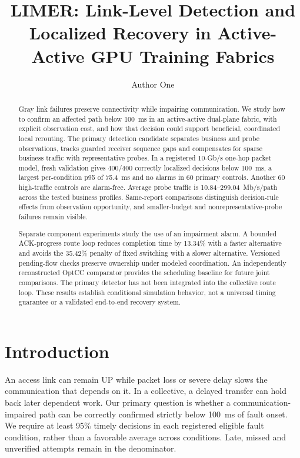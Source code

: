 \documentclass[sigconf]{acmart}
\begin{document}
\title{LIMER: Link-Level Detection and Localized Recovery
in Active-Active GPU Training Fabrics}

\author{Author One}

\begin{abstract}
Gray link failures preserve connectivity while impairing communication.
We study how to confirm an affected path below 100~ms in an active-active
dual-plane fabric, with explicit observation cost, and how that decision
could support beneficial, coordinated local rerouting. The primary
detection candidate separates business and probe observations, tracks
guarded receiver sequence gaps and compensates for sparse business traffic
with representative probes. In a registered 10-Gb/s one-hop packet model,
fresh validation gives 400/400 correctly localized decisions below 100~ms,
a largest per-condition p95 of 75.4~ms and no alarms in 60 primary controls.
Another 60 high-traffic controls are alarm-free. Average probe traffic is
10.84--299.04~Mb/s/path across the tested business profiles. Same-report
comparisons distinguish decision-rule effects from observation opportunity,
and smaller-budget and nonrepresentative-probe failures remain visible.

Separate component experiments study the use of an impairment alarm.
A bounded ACK-progress route loop reduces completion time by 13.34\%
with a faster alternative and avoids the 35.42\% penalty of fixed switching
with a slower alternative. Versioned pending-flow checks preserve ownership
under modeled coordination. An independently reconstructed OptCC comparator
provides the scheduling baseline for future joint comparisons. The primary
detector has not been integrated into the collective route loop. These
results establish conditional simulation behavior, not a universal timing
guarantee or a validated end-to-end recovery system.
\end{abstract}

\maketitle

\section{Introduction}
An access link can remain UP while packet loss or severe delay slows the
communication that depends on it. In a collective, a delayed transfer can
hold back later dependent work. Our primary question is whether a
communication-impaired path can be correctly confirmed strictly below
100~ms of fault onset. We require at least 95\% timely decisions in each
registered eligible fault condition, rather than a favorable average across
conditions. Late, missed and unverified attempts remain in the denominator.
\end{document}
